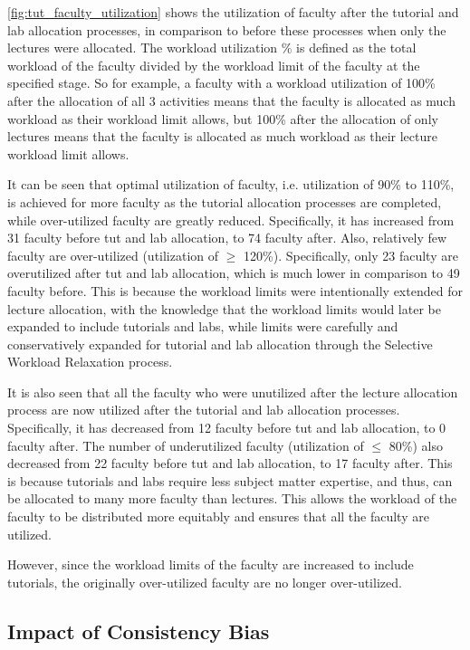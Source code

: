 \autoref{fig:tut_faculty_utilization} shows the utilization of faculty after the tutorial and lab allocation processes, in comparison to before these processes when only the lectures were allocated. The workload utilization \% is defined as the total workload of the faculty divided by the workload limit of the faculty at the specified stage. So for example, a faculty with a workload utilization of 100\% after the allocation of all 3 activities means that the faculty is allocated as much workload as their workload limit allows, but 100\% after the allocation of only lectures means that the faculty is allocated as much workload as their lecture workload limit allows.

It can be seen that optimal utilization of faculty, i.e. utilization of 90\% to 110\%, is achieved for more faculty as the tutorial allocation processes are completed, while over-utilized faculty are greatly reduced. Specifically, it has increased from 31 faculty before tut and lab allocation, to 74 faculty after. Also, relatively few faculty are over-utilized (utilization of $\geq$ 120\%). Specifically, only 23 faculty are overutilized after tut and lab allocation, which is much lower in comparison to 49 faculty before. This is because the workload limits were intentionally extended for lecture allocation, with the knowledge that the workload limits would later be expanded to include tutorials and labs, while limits were carefully and conservatively expanded for tutorial and lab allocation through the Selective Workload Relaxation process.

It is also seen that all the faculty who were unutilized after the lecture allocation process are now utilized after the tutorial and lab allocation processes. Specifically, it has decreased from 12 faculty before tut and lab allocation, to 0 faculty after. The number of underutilized faculty (utilization of $\leq$ 80\%) also decreased from 22 faculty before tut and lab allocation, to 17 faculty after. This is because tutorials and labs require less subject matter expertise, and thus, can be allocated to many more faculty than lectures. This allows the workload of the faculty to be distributed more equitably and ensures that all the faculty are utilized.

However, since the workload limits of the faculty are increased to include tutorials, the originally over-utilized faculty are no longer over-utilized.

\subsection{Impact of Consistency Bias}

